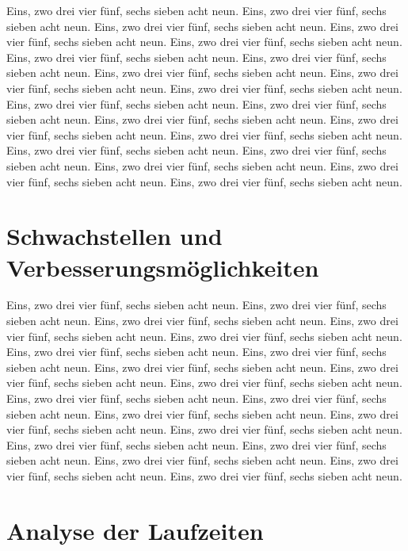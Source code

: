 \documentclass[12pt,a4paper]{article}
\begin{document}
Eins, zwo drei vier fünf, sechs sieben acht neun.
Eins, zwo drei vier fünf, sechs sieben acht neun.
Eins, zwo drei vier fünf, sechs sieben acht neun.
Eins, zwo drei vier fünf, sechs sieben acht neun.
Eins, zwo drei vier fünf, sechs sieben acht neun.
Eins, zwo drei vier fünf, sechs sieben acht neun.
Eins, zwo drei vier fünf, sechs sieben acht neun.
Eins, zwo drei vier fünf, sechs sieben acht neun.
Eins, zwo drei vier fünf, sechs sieben acht neun.
Eins, zwo drei vier fünf, sechs sieben acht neun.
Eins, zwo drei vier fünf, sechs sieben acht neun.
Eins, zwo drei vier fünf, sechs sieben acht neun.
Eins, zwo drei vier fünf, sechs sieben acht neun.
Eins, zwo drei vier fünf, sechs sieben acht neun.
Eins, zwo drei vier fünf, sechs sieben acht neun.
Eins, zwo drei vier fünf, sechs sieben acht neun.
Eins, zwo drei vier fünf, sechs sieben acht neun.
Eins, zwo drei vier fünf, sechs sieben acht neun.
Eins, zwo drei vier fünf, sechs sieben acht neun.
Eins, zwo drei vier fünf, sechs sieben acht neun.

\section{Schwachstellen und Verbesserungsmöglichkeiten}

Eins, zwo drei vier fünf, sechs sieben acht neun.
Eins, zwo drei vier fünf, sechs sieben acht neun.
Eins, zwo drei vier fünf, sechs sieben acht neun.
Eins, zwo drei vier fünf, sechs sieben acht neun.
Eins, zwo drei vier fünf, sechs sieben acht neun.
Eins, zwo drei vier fünf, sechs sieben acht neun.
Eins, zwo drei vier fünf, sechs sieben acht neun.
Eins, zwo drei vier fünf, sechs sieben acht neun.
Eins, zwo drei vier fünf, sechs sieben acht neun.
Eins, zwo drei vier fünf, sechs sieben acht neun.
Eins, zwo drei vier fünf, sechs sieben acht neun.
Eins, zwo drei vier fünf, sechs sieben acht neun.
Eins, zwo drei vier fünf, sechs sieben acht neun.
Eins, zwo drei vier fünf, sechs sieben acht neun.
Eins, zwo drei vier fünf, sechs sieben acht neun.
Eins, zwo drei vier fünf, sechs sieben acht neun.
Eins, zwo drei vier fünf, sechs sieben acht neun.
Eins, zwo drei vier fünf, sechs sieben acht neun.
Eins, zwo drei vier fünf, sechs sieben acht neun.
Eins, zwo drei vier fünf, sechs sieben acht neun.

\section{Analyse der Laufzeiten}
\end{document}
